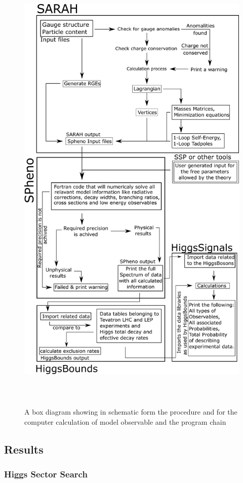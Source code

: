 \documentclass[12pt]{article}
\begin{document}
\begin{figure}[H]
\centering
\includegraphics[width=\textwidth , height=22.5cm,keepaspectratio]{shizzle.png}
\caption{A box diagram showing in schematic form the procedure and for the computer calculation of model observable and the program chain}
\label{Prog}
\end{figure}

\subsection{Results}
\subsubsection{Higgs Sector Search}
\end{document}
